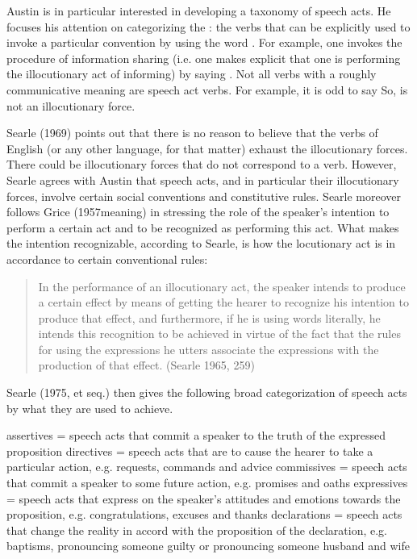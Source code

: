 Austin is in particular interested in developing a taxonomy of speech acts. He focuses his attention on categorizing the : the verbs that can be explicitly used to invoke a particular convention by using the word . For example, one invokes the procedure of information sharing (i.e. one makes explicit that one is performing the illocutionary act of informing) by saying . Not all verbs with a roughly communicative meaning are speech act verbs. For example, it is odd to say  So,  is not an illocutionary force.

Searle (1969) points out that there is no reason to believe that the verbs of English (or any other language, for that matter) exhaust the illocutionary forces. There could be illocutionary forces that do not correspond to a verb. However, Searle agrees with Austin that speech acts, and in particular their illocutionary forces, involve certain social conventions and constitutive rules. Searle moreover follows Grice (1957meaning) in stressing the role of the speaker’s intention to perform a certain act and to be recognized as performing this act. What makes the intention recognizable, according to Searle, is how the locutionary act is in accordance to certain conventional rules:

\begin{quote}
    

In the performance of an illocutionary act, the speaker intends to produce a certain effect by means of getting the hearer to recognize his intention to produce that effect, and furthermore, if he is using words literally, he intends this recognition to be achieved in virtue of the fact that the rules for using the expressions he utters associate the expressions with the production of that effect. \hfill (Searle 1965, 259)
\end{quote}

Searle (1975, et seq.) then gives the following broad categorization of speech acts by what they are used to achieve.

\bxl
assertives = speech acts that commit a speaker to the truth of the expressed proposition
\ex directives = speech acts that are to cause the hearer to take a particular action, e.g. requests, commands and advice
\ex commissives = speech acts that commit a speaker to some future action, e.g. promises and oaths
\ex expressives = speech acts that express on the speaker's attitudes and emotions towards the proposition, e.g. congratulations, excuses and thanks
\ex declarations = speech acts that change the reality in accord with the proposition of the declaration, e.g. baptisms, pronouncing someone guilty or pronouncing someone husband and wife
\exl
\eex

